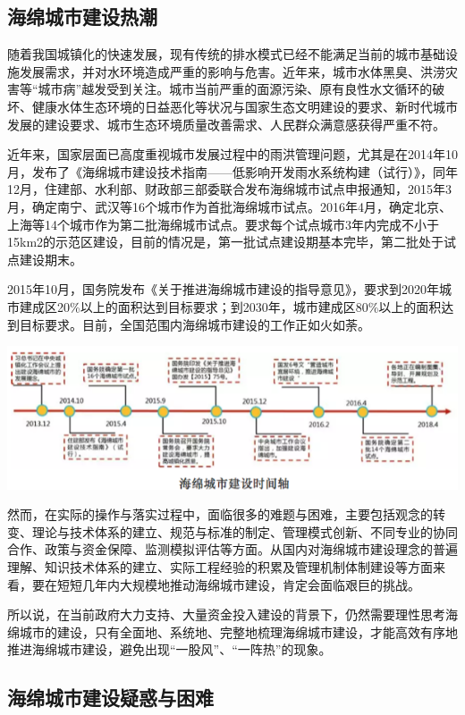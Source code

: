 \documentclass[]{book}
\begin{document}
\subsection{海绵城市建设热潮}

随着我国城镇化的快速发展，现有传统的排水模式已经不能满足当前的城市基础设施发展需求，并对水环境造成严重的影响与危害。近年来，城市水体黑臭、洪涝灾害等``城市病''越发受到关注。城市当前严重的面源污染、原有良性水文循环的破坏、健康水体生态环境的日益恶化等状况与国家生态文明建设的要求、新时代城市发展的建设要求、城市生态环境质量改善需求、人民群众满意感获得严重不符。

近年来，国家层面已高度重视城市发展过程中的雨洪管理问题，尤其是在2014年10月，发布了《海绵城市建设技术指南------低影响开发雨水系统构建（试行）》，同年12月，住建部、水利部、财政部三部委联合发布海绵城市试点申报通知，2015年3月，确定南宁、武汉等16个城市作为首批海绵城市试点。2016年4月，确定北京、上海等14个城市作为第二批海绵城市试点。要求每个试点城市3年内完成不小于15km2的示范区建设，目前的情况是，第一批试点建设期基本完毕，第二批处于试点建设期末。

2015年10月，国务院发布《关于推进海绵城市建设的指导意见》，要求到2020年城市建成区20\%以上的面积达到目标要求；到2030年，城市建成区80\%以上的面积达到目标要求。目前，全国范围内海绵城市建设的工作正如火如荼。

\includegraphics[width=8.33in]{images/hm1}

然而，在实际的操作与落实过程中，面临很多的难题与困难，主要包括观念的转变、理论与技术体系的建立、规范与标准的制定、管理模式创新、不同专业的协同合作、政策与资金保障、监测模拟评估等方面。从国内对海绵城市建设理念的普遍理解、知识技术体系的建立、实际工程经验的积累及管理机制体制建设等方面来看，要在短短几年内大规模地推动海绵城市建设，肯定会面临艰巨的挑战。

所以说，在当前政府大力支持、大量资金投入建设的背景下，仍然需要理性思考海绵城市的建设，只有全面地、系统地、完整地梳理海绵城市建设，才能高效有序地推进海绵城市建设，避免出现``一股风''、``一阵热''的现象。

\subsection{海绵城市建设疑惑与困难}
\end{document}
